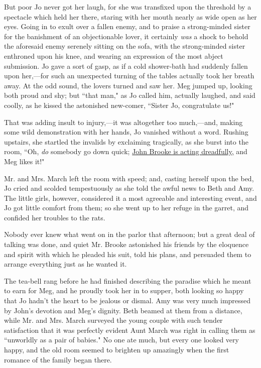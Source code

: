 But poor Jo never got her laugh, for she was transfixed upon the
threshold by a spectacle which held her there, staring with her mouth
nearly as wide open as her eyes. Going in to exult over a fallen enemy,
and to praise a strong-minded sister for the banishment of an
objectionable lover, it certainly \emph{was} a shock to behold the
aforesaid enemy serenely sitting on the sofa, with the strong-minded
sister enthroned upon his knee, and wearing an expression of the most
abject submission. Jo gave a sort of gasp, as if a cold shower-bath had
suddenly fallen upon her,---for such an unexpected turning of the tables
actually took her breath away. At the odd sound, the lovers turned and
saw her. Meg jumped up, looking both proud and shy; but ``that man," as
Jo called him, actually laughed, and said coolly, as he kissed the
astonished new-comer, ``Sister Jo, congratulate us!"

That was adding insult to injury,---it was altogether too much,---and,
making some wild demonstration with her hands, Jo vanished without a
word. Rushing upstairs, she startled the invalids by exclaiming
tragically, as she burst into the room, ``Oh, \emph{do} somebody go down
quick; \underline{John Brooke is acting dreadfully,} and Meg likes it!"

Mr. and Mrs. March left the room with speed; and, casting herself upon
the bed, Jo cried and scolded tempestuously as she told the awful news
to Beth and Amy. The little girls, however, considered it a most
agreeable and interesting event, and Jo got little comfort from them; so
she went up to her refuge in the garret, and confided her troubles to
the rats.

Nobody ever knew what went on in the parlor that afternoon; but a great
deal of talking was done, and quiet Mr. Brooke astonished his friends by
the eloquence and spirit with which he pleaded his suit, told his plans,
and persuaded them to arrange everything just as he wanted it.

The tea-bell rang before he had finished describing the paradise which
he meant to earn for Meg, and he proudly took her in to supper, both
looking so happy that Jo hadn't the heart to be jealous
or dismal. Amy was very much impressed by John's
devotion and Meg's dignity. Beth beamed at them from a
distance, while Mr. and Mrs. March surveyed the young couple with such
tender satisfaction that it was perfectly evident Aunt March was right
in calling them as ``unworldly as a pair of babies." No one ate much, but
every one looked very happy, and the old room seemed to brighten up
amazingly when the first romance of the family began there.

